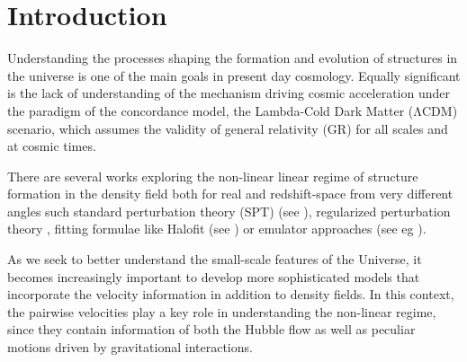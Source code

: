 \documentclass[%
 reprint,
groupedaddress,
nofootinbib,
nobibnotes,
 amsmath,amssymb,
 aps,
]{revtex4-2}
\newcommand{\lcdm}{$\mathrm{\Lambda CDM}$}
\newcommand{\<}{\langle}
\renewcommand{\>}{\rangle}
\newcommand{\WH}[1]{\textcolor{orange}{(WOJTEK: #1)}}
\newcommand{\JGF}[1]{\textcolor{NavyBlue}{#1}}
\newcommand{\quickwordcount}[1]{%
  \immediate\write18{texcount -1 -sum=1,1,1,0,0,1,1 -merge -q #1.tex output.bbl > #1-words.sum }%
   words%
}
\begin{document}
\maketitle


\section{\label{sec:intro}Introduction}
Understanding the processes shaping the formation and evolution of structures in the universe is one of the main goals in present day cosmology. Equally significant is the lack of understanding of the mechanism driving cosmic acceleration under the paradigm of the concordance model, the Lambda-Cold Dark Matter (\lcdm{}) scenario, which assumes the validity of general relativity (GR) for all scales and at cosmic times. 


%
There are several works exploring the non-linear linear regime of structure formation in the density field  both for real and redshift-space from very different angles such standard perturbation theory (SPT) (see \cite{2004PhRvD..70h3007S, 2010PhRvD..82f3522T, 2002PhR...367....1B, 2012JCAP...11..029G, 2006PhRvD..73f3519C}), regularized perturbation theory \citep{2014ascl.soft04012T}, fitting formulae like Halofit (see  \cite{2019MNRAS.486.1448S, 2012ApJ...761..152T,2015MNRAS.454.1958M}) or  emulator approaches (see eg \cite{2014ApJ...780..111H, 2019PhRvD.100l3540W, 2021MNRAS.505.2840E}).

As we seek to better understand the small-scale features of the Universe, it becomes increasingly important to develop more sophisticated models that incorporate the velocity information in addition to density fields. 
%
In this context, the pairwise velocities play a key role in understanding the non-linear regime, since they contain information of both the Hubble flow as well as peculiar motions driven by gravitational interactions. 
\end{document}
